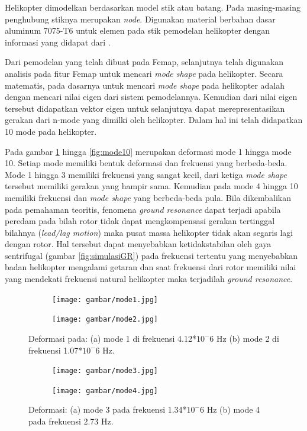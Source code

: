 Helikopter dimodelkan berdasarkan model stik atau batang. Pada masing-masing penghubung stiknya merupakan \textit{node}. Digunakan material berbahan dasar aluminum 7075-T6 untuk elemen pada stik pemodelan helikopter dengan informasi yang didapat dari \cite{ASTM}.

Dari pemodelan yang telah dibuat pada Femap, selanjutnya telah digunakan analisis pada fitur Femap untuk mencari \textit{mode shape} pada helikopter. Secara matematis, pada dasarnya untuk mencari \textit{mode shape} pada helikopter adalah dengan mencari nilai eigen dari sistem pemodelannya. Kemudian dari nilai eigen tersebut didapatkan vektor eigen untuk selanjutnya dapat merepresentasikan gerakan dari n-mode yang dimilki oleh helikopter. Dalam hal ini telah didapatkan 10 mode pada helikopter.

Pada gambar \ref{fig:mode1} hingga \ref{fig:mode10} merupakan deformasi mode 1 hingga mode 10. Setiap mode memiliki bentuk deformasi dan frekuensi yang berbeda-beda. Mode 1 hingga 3 memiliki frekuensi yang sangat kecil, dari ketiga \textit{mode shape} tersebut memiliki gerakan yang hampir sama. Kemudian pada mode 4 hingga 10 memiliki frekuensi dan \textit{mode shape} yang berbeda-beda pula. Bila dikembalikan pada pemahaman teoritis, fenomena \textit{ground resonance} dapat terjadi apabila peredam pada bilah rotor tidak dapat mengkompensasi gerakan tertinggal bilahnya (\textit{lead/lag motion}) maka pusat massa helikopter tidak akan segaris lagi dengan rotor. Hal tersebut dapat menyebabkan ketidakstabilan oleh gaya sentrifugal (gambar \ref{fig:simulasiGR}) pada frekuensi tertentu yang menyebabkan badan helikopter mengalami getaran dan saat frekuensi dari rotor memiliki nilai yang mendekati frekuensi natural helikopter maka terjadilah \textit{ground resonance}.

\begin{figure}[H]
	\begin{subfigure}{0.49\textwidth}
		\centering
		\texttt{[image: gambar/mode1.jpg]}
		\caption{}
		\label{fig:mode1}
	\end{subfigure}
	\centering
	\begin{subfigure}{0.49\textwidth}
		\centering
		\texttt{[image: gambar/mode2.jpg]}
		\caption{}
		\label{fig:mode2}
	\end{subfigure}
	\caption{Deformasi pada: (a) mode 1 di frekuensi 4.12*$10^-6$ Hz (b) mode 2 di frekuensi 1.07*$10^-6$ Hz.}
	\label{fig:modeshape1}
\end{figure}

\begin{figure}[H]
	\begin{subfigure}{0.49\textwidth}
		\centering
		\texttt{[image: gambar/mode3.jpg]}
		\caption{}
		\label{fig:mode3}
	\end{subfigure}
	\centering
	\begin{subfigure}{0.49\textwidth}
		\centering
		\texttt{[image: gambar/mode4.jpg]}
		\caption{}
		\label{fig:mode4}
	\end{subfigure}
	\caption{Deformasi: (a) mode 3 pada frekuensi 1.34*$10^-6$ Hz (b) mode 4 pada frekuensi 2.73 Hz.}
\end{figure}

